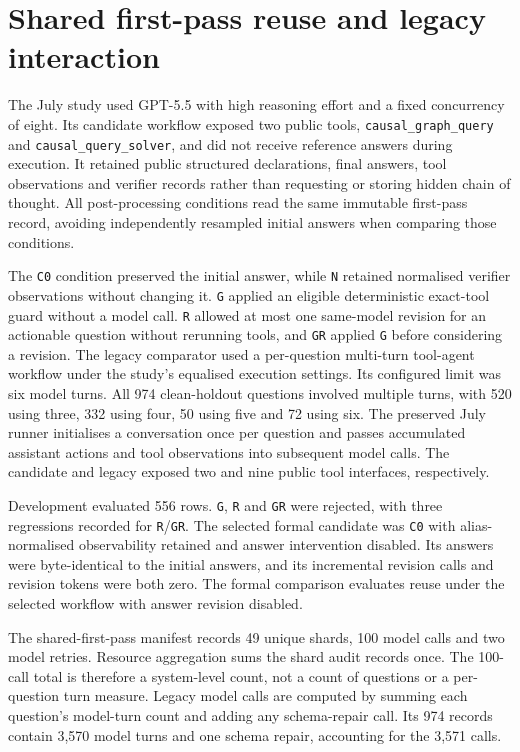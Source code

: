 \section{Shared first-pass reuse and legacy interaction}\label{sec:6.3}

The July study used GPT-5.5 with high reasoning effort and a fixed concurrency of eight. Its candidate workflow exposed two public tools, \texttt{causal\_graph\_query} and \texttt{causal\_query\_solver}, and did not receive reference answers during execution. It retained public structured declarations, final answers, tool observations and verifier records rather than requesting or storing hidden chain of thought. All post-processing conditions read the same immutable first-pass record, avoiding independently resampled initial answers when comparing those conditions.

The \texttt{C0} condition preserved the initial answer, while \texttt{N} retained normalised verifier observations without changing it. \texttt{G} applied an eligible deterministic exact-tool guard without a model call. \texttt{R} allowed at most one same-model revision for an actionable question without rerunning tools, and \texttt{GR} applied \texttt{G} before considering a revision. The legacy comparator used a per-question multi-turn tool-agent workflow under the study's equalised execution settings. Its configured limit was six model turns. All 974 clean-holdout questions involved multiple turns, with 520 using three, 332 using four, 50 using five and 72 using six. The preserved July runner initialises a conversation once per question and passes accumulated assistant actions and tool observations into subsequent model calls. The candidate and legacy exposed two and nine public tool interfaces, respectively.

Development evaluated 556 rows. \texttt{G}, \texttt{R} and \texttt{GR} were rejected, with three regressions recorded for \texttt{R}/\texttt{GR}. The selected formal candidate was \texttt{C0} with alias-normalised observability retained and answer intervention disabled. Its answers were byte-identical to the initial answers, and its incremental revision calls and revision tokens were both zero. The formal comparison evaluates reuse under the selected workflow with answer revision disabled.

The shared-first-pass manifest records 49 unique shards, 100 model calls and two model retries. Resource aggregation sums the shard audit records once. The 100-call total is therefore a system-level count, not a count of questions or a per-question turn measure. Legacy model calls are computed by summing each question's model-turn count and adding any schema-repair call. Its 974 records contain 3,570 model turns and one schema repair, accounting for the 3,571 calls.

